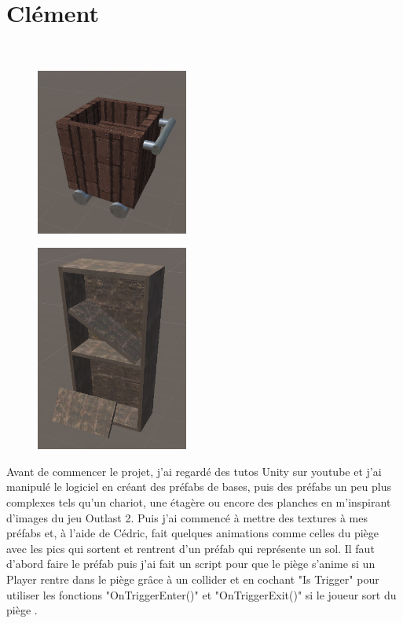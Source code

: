 \documentclass[titlepage, 13px, a4paper]{article}
\begin{document}
\newpage

\section{Clément}
\paragraph{} \hspace{0pt} \\
\begin{figure}
\includegraphics[width=5cm]{chariot-game.png}
\end{figure}
\begin{figure}
\includegraphics[width=5cm]{etagerecasse-game.png}
\end{figure}
Avant de commencer le projet, j'ai regardé des tutos Unity sur youtube et j'ai manipulé le logiciel en créant 
des préfabs de bases, puis des préfabs un peu plus complexes tels qu'un chariot, une étagère ou encore des 
planches en m'inspirant d'images du jeu Outlast 2. Puis j'ai commencé à mettre des textures à mes préfabs et,
à l'aide de Cédric, fait quelques animations comme celles du piège avec les pics qui sortent et rentrent d'un
préfab qui représente un sol. Il faut d'abord faire le préfab puis j'ai fait un script pour que le piège 
s'anime si un Player rentre dans le piège grâce à un collider et en cochant "Is Trigger" pour utiliser les
fonctions "OnTriggerEnter()" et "OnTriggerExit()" si le joueur sort du piège . \\
\end{document}
